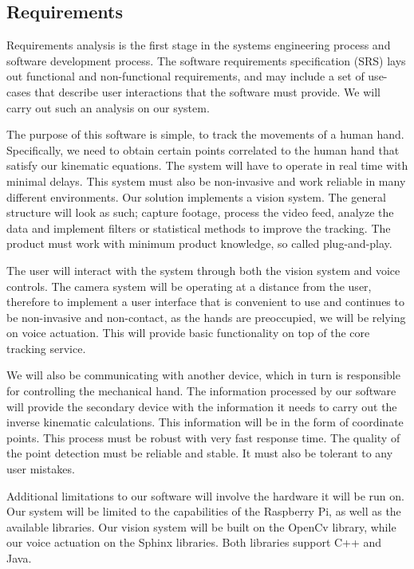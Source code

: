 \documentclass{article}
\begin{document}
\subsection{Requirements}
Requirements analysis is the first stage in the systems engineering process and software development process. The software requirements specification (SRS) lays out functional and non-functional requirements, and may include a set of use-cases that describe user interactions that the software must provide. We will carry out such an analysis on our system.

The purpose of this software is simple, to track the movements of a human hand. Specifically, we need to obtain certain points correlated to the human hand that satisfy our kinematic equations. The system will have to operate in real time with minimal delays. This system must also be non-invasive and work reliable in many different environments. Our solution implements a vision system. The general structure will look as such; capture footage, process the video feed, analyze the data and implement filters or statistical methods to improve the tracking. The product must work with minimum product knowledge, so called plug-and-play.

The user will interact with the system through both the vision system and voice controls. The camera system will be operating at a distance from the user, therefore to implement a user interface that is convenient to use and continues to be non-invasive and non-contact, as the hands are preoccupied, we will be relying on voice actuation. This will provide basic functionality on top of the core tracking service. 

We will also be communicating with another device, which in turn is responsible for controlling the mechanical hand. The information processed by our software will provide the secondary device with the information it needs to carry out the inverse kinematic calculations. This information will be in the form of coordinate points. This process must be robust with very fast response time. The quality of the point detection must be reliable and stable. It must also be tolerant to any user mistakes.

Additional limitations to our software will involve the hardware it will be run on. Our system will be limited to the capabilities of the Raspberry Pi, as well as the available libraries. Our vision system will be built on the OpenCv library, while our voice actuation on the Sphinx libraries. Both libraries support C++ and Java.\vspace{12pt}
\end{document}
